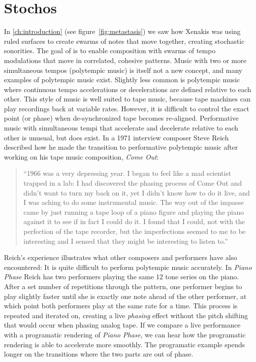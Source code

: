 \section{Stochos}
\label{sec:polytempic-stochos}
In \autoref{ch:introduction} (see figure~\ref{fig:metastasis}) we saw
how Xenakis was using ruled surfaces to create swarms of notes that
move together, creating stochastic sonorities. The goal of \polytempic
is to enable composition with swarms of tempo modulations that move in
correlated, cohesive patterns. Music with two or more simultaneous
tempos (polytempic music) is itself not a new concept, and many
examples of polytempic music exist.\cite{Greschak2003} Slightly less
common is polytempic music where continuous tempo accelerations or
decelerations are defined relative to each other. This style of music
is well suited to tape music, because tape machines can play
recordings back at variable rates. However, it is difficult to control
the exact point (or phase) when de-synchronized tape becomes
re-aligned. Performative music with simultaneous tempi that accelerate
and decelerate relative to each other is unusual, but does exist. In
a 1971 interview composer Steve Reich described how he made the
transition to performative polytempic music after working on his tape
music composition, \textit{Come Out}:
\begin{quotation}
  ``1966 was a very depressing year. I began to feel like a mad
  scientist trapped in a lab: I had discovered the phasing process
  of Come Out and didn't want to turn my back on it, yet I didn't know
  how to do it live, and I was aching to do some instrumental
  music. The way out of the impasse came by just running a tape loop
  of a piano figure and playing the piano against it to see if in fact
  I could do it. I found that I could, not with the perfection of the
  tape recorder, but the imperfections seemed to me to be interesting
  and I sensed that they might be interesting to listen to.''\cite{Nyman2015}
\end{quotation}
Reich's experience illustrates what other composers and performers
have also encountered: It is quite difficult to perform polytempic
music accurately. In \textit{Piano Phase} Reich has two performers
playing the same 12 tone series on the piano. After a set number of
repetitions through the pattern, one performer begins to play slightly
faster until she is exactly one note ahead of the other performer, at
which point both performers play at the same rate for a time. This
process is repeated and iterated on, creating a live \emph{phasing}
effect without the pitch shifting that would occur when phasing analog
tape. If we compare a live performance\cite{Huisman1989} with a
programatic rendering\cite{Chen2014} of \textit{Piano Phase}, we can
hear how the programatic rendering is able to accelerate more
smoothly. The programatic example spends longer on the transitions
where the two parts are out of phase.

